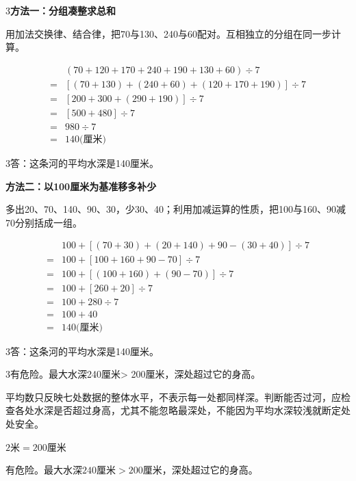 \documentclass[multi=snippet,border={5bp 20bp 5bp 5bp}]{standalone}
\newenvironment{snippet}[3]{\begin{minipage}{#1bp}\color{answerred}\fontsize{#2}{#3}\selectfont\raggedright}{\end{minipage}}
\begin{document}
\begin{snippet}{505}{11.5}{14}\begin{multicols}{3}\raggedcolumns \textbf{方法一：分组凑整求总和}\par 用加法交换律、结合律，把70与130、240与60配对。互相独立的分组在同一步计算。\end{multicols}\[\begin{aligned}&(70+120+170+240+190+130+60)\div7\\={}&[(70+130)+(240+60)+(120+170+190)]\div7\\={}&[200+300+(290+190)]\div7\\={}&[500+480]\div7\\={}&980\div7\\={}&140\text{(厘米)}\end{aligned}\]\begin{multicols}{3}\raggedcolumns 答：这条河的平均水深是140厘米。\par\textbf{方法二：以100厘米为基准移多补少}\par 多出20、70、140、90、30，少30、40；利用加减运算的性质，把100与160、90减70分别括成一组。\end{multicols}\[\begin{aligned}&100+[(70+30)+(20+140)+90-(30+40)]\div7\\={}&100+[100+160+90-70]\div7\\={}&100+[(100+160)+(90-70)]\div7\\={}&100+[260+20]\div7\\={}&100+280\div7\\={}&100+40\\={}&140\text{(厘米)}\end{aligned}\]\begin{multicols}{3}\raggedcolumns 答：这条河的平均水深是140厘米。\end{multicols}\end{snippet}
\begin{snippet}{505}{11.5}{14}\begin{multicols}{3}\raggedcolumns 有危险。最大水深240厘米> 200厘米，深处超过它的身高。\par 平均数只反映七处数据的整体水平，不表示每一处都同样深。判断能否过河，应检查各处水深是否超过身高，尤其不能忽略最深处，不能因为平均水深较浅就断定处处安全。\end{multicols}\end{snippet}
\begin{snippet}{505}{11}{14}\SourceSans\setlength{\mathindent}{2bp}\(2\text{米}=200\text{厘米}\)\par 有危险。最大水深\(240\text{厘米}>200\text{厘米}\)，深处超过它的身高。\end{snippet}
\end{document}
